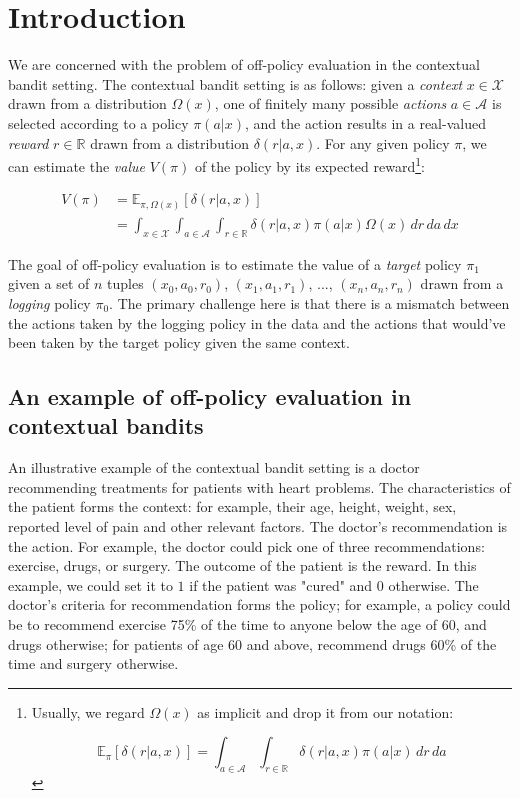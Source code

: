 \documentclass[sigplan,screen]{acmart}
\begin{document}
\maketitle

\section{Introduction}
We are concerned with the problem of off-policy evaluation in the contextual bandit setting. The contextual bandit setting is as follows: given a \textit{context} $x \in \mathcal{X}$ drawn from a distribution $\Omega(x)$, one of finitely many possible \textit{actions} $a \in \mathcal{A}$ is selected according to a policy $\pi(a|x)$, and the action results in a real-valued \textit{reward} $r \in \mathbb{R}$ drawn from a distribution $\delta(r|a,x)$. For any given policy $\pi$, we can estimate the \textit{value} $V(\pi)$ of the policy by its expected reward\footnote{Usually, we regard $\Omega(x)$ as implicit and drop it from our notation: 

$$\mathbb{E}_{\pi}[\delta(r|a,x)] = \int_{a \in \mathcal{A}} \int_{r \in \mathbb{R}} \delta(r|a,x) \pi(a|x) \, dr \, da$$}:

\begin{align}
    V(\pi) &= \mathbb{E}_{\pi, \Omega(x)}[\delta(r|a,x)] \\ 
    &= \int_{x \in \mathcal{X}} \int_{a \in \mathcal{A}} \int_{r \in \mathbb{R}} \delta(r|a,x) \pi(a|x) \Omega(x) \, dr \, da \, dx
\end{align} 

The goal of off-policy evaluation is to estimate the value of a \textit{target} policy $\pi_1$ given a set of $n$ tuples $(x_0, a_0, r_0)$, $(x_1, a_1, r_1)$, ..., $(x_n, a_n, r_n)$ drawn from a \textit{logging} policy $\pi_0$. The primary challenge here is that there is a mismatch between the actions taken by the logging policy in the data and the actions that would've been taken by the target policy given the same context.

\subsection{An example of off-policy evaluation in contextual bandits}
An illustrative example of the contextual bandit setting is a doctor recommending treatments for patients with heart problems. The characteristics of the patient forms the context: for example, their age, height, weight, sex, reported level of pain and other relevant factors. The doctor's recommendation is the action. For example, the doctor could pick one of three recommendations: exercise, drugs, or surgery. The outcome of the patient is the reward. In this example, we could set it to $1$ if the patient was "cured" and $0$ otherwise. The doctor's criteria for recommendation forms the policy; for example, a policy could be to recommend exercise 75\% of the time to anyone below the age of 60, and drugs otherwise; for patients of age 60 and above, recommend drugs 60\% of the time and surgery otherwise.
\end{document}
